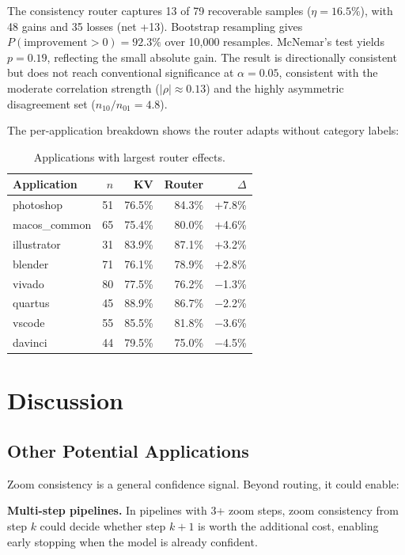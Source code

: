 \documentclass{article}
\begin{document}
The consistency router captures 13 of 79 recoverable samples ($\eta = 16.5\%$), with 48 gains and 35 losses (net +13). Bootstrap resampling gives $P(\text{improvement} > 0) = 92.3\%$ over 10,000 resamples. McNemar's test yields $p = 0.19$, reflecting the small absolute gain. The result is directionally consistent but does not reach conventional significance at $\alpha = 0.05$, consistent with the moderate correlation strength ($|\rho| \approx 0.13$) and the highly asymmetric disagreement set ($n_{10}/n_{01} = 4.8$).

The per-application breakdown shows the router adapts without category labels:

\begin{table}[h]
\centering
\caption{Applications with largest router effects.}
\label{tab:perapps}
\small
\begin{tabular}{lrrrr}
\toprule
\textbf{Application} & \textbf{$n$} & \textbf{KV} & \textbf{Router} & \textbf{$\Delta$} \\
\midrule
photoshop & 51 & 76.5\% & 84.3\% & +7.8\% \\
macos\_common & 65 & 75.4\% & 80.0\% & +4.6\% \\
illustrator & 31 & 83.9\% & 87.1\% & +3.2\% \\
blender & 71 & 76.1\% & 78.9\% & +2.8\% \\
\midrule
vivado & 80 & 77.5\% & 76.2\% & $-$1.3\% \\
quartus & 45 & 88.9\% & 86.7\% & $-$2.2\% \\
vscode & 55 & 85.5\% & 81.8\% & $-$3.6\% \\
davinci & 44 & 79.5\% & 75.0\% & $-$4.5\% \\
\bottomrule
\end{tabular}
\end{table}

\section{Discussion}

\subsection{Other Potential Applications}

Zoom consistency is a general confidence signal. Beyond routing, it could enable:

\textbf{Multi-step pipelines.} In pipelines with 3+ zoom steps, zoom consistency from step $k$ could decide whether step $k{+}1$ is worth the additional cost, enabling early stopping when the model is already confident.
\end{document}
